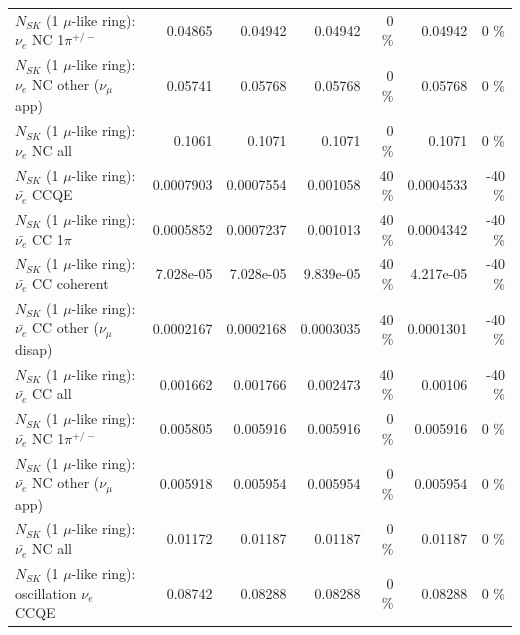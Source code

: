 \begin{table}
\begin{tabular}{| l | r | r | r  r | r  r |}
\hline
                           $N_{SK}$ (1 $\mu$-like ring): $\nu_e$ NC 1$\pi^{+/-}$ &         0.04865 &         0.04942 &         0.04942 &        0 \%  &         0.04942 &        0 \%  \\ 
                  $N_{SK}$ (1 $\mu$-like ring): $\nu_e$ NC other ($\nu_\mu$ app) &         0.05741 &         0.05768 &         0.05768 &        0 \%  &         0.05768 &        0 \%  \\ 
                                  $N_{SK}$ (1 $\mu$-like ring): $\nu_{e}$ NC all &          0.1061 &          0.1071 &          0.1071 &        0 \%  &          0.1071 &        0 \%  \\ 
\hline
\hline
\hline
                                $N_{SK}$ (1 $\mu$-like ring): $\bar{\nu_e}$ CCQE &       0.0007903 &       0.0007554 &        0.001058 &       40 \%  &       0.0004533 &      -40 \%  \\ 
                           $N_{SK}$ (1 $\mu$-like ring): $\bar{\nu_e}$ CC 1$\pi$ &       0.0005852 &       0.0007237 &        0.001013 &       40 \%  &       0.0004342 &      -40 \%  \\ 
                         $N_{SK}$ (1 $\mu$-like ring): $\bar{\nu_e}$ CC coherent &       7.028e-05 &       7.028e-05 &       9.839e-05 &       40 \%  &       4.217e-05 &      -40 \%  \\ 
          $N_{SK}$ (1 $\mu$-like ring): $\bar{\nu_e}$ CC other ($\nu_\mu$ disap) &       0.0002167 &       0.0002168 &       0.0003035 &       40 \%  &       0.0001301 &      -40 \%  \\ 
                            $N_{SK}$ (1 $\mu$-like ring): $\bar{\nu_{e}}$ CC all &        0.001662 &        0.001766 &        0.002473 &       40 \%  &         0.00106 &      -40 \%  \\ 
\hline
                     $N_{SK}$ (1 $\mu$-like ring): $\bar{\nu_e}$ NC 1$\pi^{+/-}$ &        0.005805 &        0.005916 &        0.005916 &        0 \%  &        0.005916 &        0 \%  \\ 
            $N_{SK}$ (1 $\mu$-like ring): $\bar{\nu_e}$ NC other ($\nu_\mu$ app) &        0.005918 &        0.005954 &        0.005954 &        0 \%  &        0.005954 &        0 \%  \\ 
                            $N_{SK}$ (1 $\mu$-like ring): $\bar{\nu_{e}}$ NC all &         0.01172 &         0.01187 &         0.01187 &        0 \%  &         0.01187 &        0 \%  \\ 
\hline
\hline
\hline
                          $N_{SK}$ (1 $\mu$-like ring): oscillation $\nu_e$ CCQE &         0.08742 &         0.08288 &         0.08288 &        0 \%  &         0.08288 &        0 \%  \\ 

\end{tabular}
\end{table}
